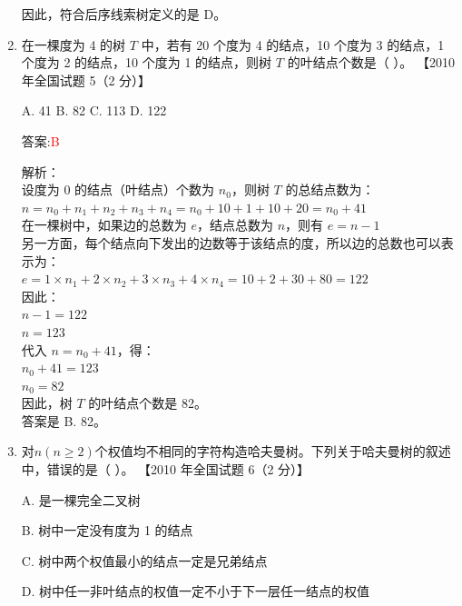 \documentclass[lang=cn,newtx,10pt,scheme=chinese]{../../../elegantbook}
\begin{document}
\begin{enumerate}
        因此，符合后序线索树定义的是 D。\\
    

        \item 在一棵度为 4 的树 $T$ 中，若有 20 个度为 4 的结点，10 个度为 3 的结点，1 个度为 2 的结点，10 个度为 1 的结点，则树 $T$ 的叶结点个数是（ ）。  
        【2010 年全国试题 5（2 分）】 
    
        A. 41 \quad B. 82 \quad C. 113 \quad D. 122  
    
        答案:\textcolor{red}{B}
        
        解析：\\
        设度为 0 的结点（叶结点）个数为 $n_0$，则树 $T$ 的总结点数为：\\
        $n = n_0 + n_1 + n_2 + n_3 + n_4 = n_0 + 10 + 1 + 10 + 20 = n_0 + 41$\\
        
        在一棵树中，如果边的总数为 $e$，结点总数为 $n$，则有 $e = n - 1$\\
        
        另一方面，每个结点向下发出的边数等于该结点的度，所以边的总数也可以表示为：\\
        $e = 1 \times n_1 + 2 \times n_2 + 3 \times n_3 + 4 \times n_4 = 10 + 2 + 30 + 80 = 122$\\
        
        因此：\\
        $n - 1 = 122$\\
        $n = 123$\\
        
        代入 $n = n_0 + 41$，得：\\
        $n_0 + 41 = 123$\\
        $n_0 = 82$\\
        
        因此，树 $T$ 的叶结点个数是 82。\\
        
        答案是 B. 82。
    
        \item 对$n(n≥2)$个权值均不相同的字符构造哈夫曼树。下列关于哈夫曼树的叙述中，错误的是（ ）。  
        【2010 年全国试题 6（2 分）】  
    
        A. 是一棵完全二叉树  
    
        B. 树中一定没有度为 1 的结点  
    
        C. 树中两个权值最小的结点一定是兄弟结点
    
        D. 树中任一非叶结点的权值一定不小于下一层任一结点的权值  
    

\end{enumerate}
\end{document}

